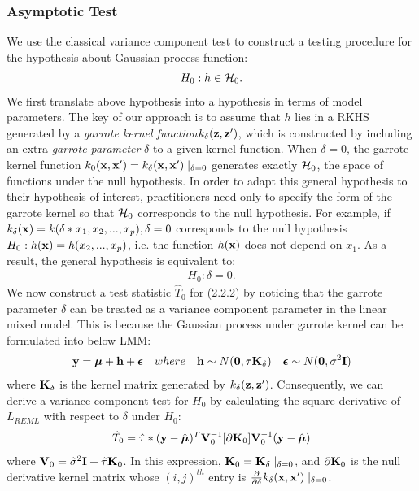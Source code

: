 \documentclass[11pt]{article}
\begin{document}
\subsubsection{{Asymptotic Test}}
We use the classical variance component test to construct a testing procedure for the hypothesis about Gaussian process function:
\begin{align}
H_0: h \in {\cal H}_0.
\end{align}
We first translate above hypothesis into a hypothesis in terms of model parameters. The key of our approach is to assume that $h$ lies in a RKHS generated by a \textsl{garrote kernel function}$k_{\delta}({\bf z}, {\bf z}')$, which is constructed by including an extra \textsl{garrote parameter} $\delta$ to a given kernel function. When $\delta=0$, the garrote kernel function $k_0({\bf x}, {\bf x}')=k_{\delta}({\bf x}, {\bf x}')\mid _{\delta=0}$ generates exactly ${\cal H}_0$, the space of functions under the null hypothesis. In order to adapt this general hypothesis to their hypothesis of interest, practitioners need only to specify the form of the garrote kernel so that ${\cal H}_0$ corresponds to the null hypothesis. For example, if $k_{\delta}({\bf x})=k(\delta * x_1, x_2,..., x_p), \delta=0$ corresponds to the null hypothesis $H_0: h({\bf x})=h(x_2,...,x_p)$, i.e. the function $h({\bf x})$ does not depend on $x_1$. As a result, the general hypothesis is equivalent to:
\begin{align}
H_0: \delta=0.
\end{align}
We now construct a test statistic $\hat{T}_0$ for (2.2.2) by noticing that the garrote parameter $\delta$ can be treated as a variance component parameter in the linear mixed model. This is because the Gaussian process under garrote kernel can be formulated into below LMM:
\begin{align*}
{\bf y}=\boldsymbol{\mu}+{\bf h}+\boldsymbol{\epsilon} \quad where \quad {\bf h} \sim N(\mathbf{0}, \tau {\bf K}_\delta) \quad \boldsymbol{\epsilon} \sim N(\mathbf{0}, \sigma^2{\bf I})
\end{align*}
where ${\bf K}_\delta$ is the kernel matrix generated by $k_{\delta}({\bf z}, {\bf z}')$. Consequently, we can derive a variance component test for $H_0$ by calculating the square derivative of $L_{REML}$ with respect to $\delta$ under $H_0$:
\begin{align}
\hat{T}_0=\hat{\tau}*({\bf y}-\hat{\boldsymbol{\mu}})^T{\bf V}_0^{-1}[\partial {\bf K}_0]{\bf V}_0^{-1}({\bf y}-\hat{\boldsymbol{\mu}})
\end{align}
where ${\bf V}_0=\hat{\sigma}^2{\bf I}+\hat{\tau}{\bf K}_0$. In this expression, ${\bf K}_0={\bf K}_\delta \mid_{\delta=0}$, and $\partial {\bf K}_0$ is the null derivative kernel matrix whose $(i, j)^{th}$ entry is $\frac{\partial }{\partial \delta}k_\delta({\bf x}, {\bf x}') \mid_{\delta=0}$.
\end{document}
